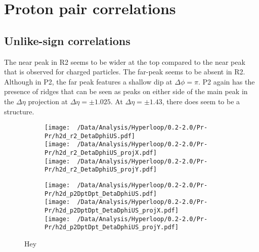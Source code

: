 \documentclass[12pt,a4paper,twoside]{report}
\begin{document}
\section{Proton pair correlations}
\subsection{Unlike-sign correlations}
The near peak in R2 seems to be wider at the top compared to the near peak that is observed for charged particles. The far-peak seems to be absent in R2. Although in P2, the far peak features a shallow dip at $\Delta\phi=\pi$.
P2 again has the presence of ridges that can be seen as peaks on either side of the main peak in the $\Delta\eta$ projection at $\Delta\eta=\pm1.025$. At $\Delta\eta=\pm1.43$, there does seem to be a structure.
\begin{figure}[H]
	\begin{subfigure}{0.49\linewidth}
		\texttt{[image: ~/Data/Analysis/Hyperloop/0.2-2.0/Pr-Pr/h2d\_r2\_DetaDphiUS.pdf]}\\
		\texttt{[image: ~/Data/Analysis/Hyperloop/0.2-2.0/Pr-Pr/h2d\_r2\_DetaDphiUS\_projX.pdf]}\\
		\texttt{[image: ~/Data/Analysis/Hyperloop/0.2-2.0/Pr-Pr/h2d\_r2\_DetaDphiUS\_projY.pdf]}\\
	\end{subfigure}
	\begin{subfigure}{0.49\linewidth}
		\texttt{[image: ~/Data/Analysis/Hyperloop/0.2-2.0/Pr-Pr/h2d\_p2DptDpt\_DetaDphiUS.pdf]}\\
		\texttt{[image: ~/Data/Analysis/Hyperloop/0.2-2.0/Pr-Pr/h2d\_p2DptDpt\_DetaDphiUS\_projX.pdf]}\\
		\texttt{[image: ~/Data/Analysis/Hyperloop/0.2-2.0/Pr-Pr/h2d\_p2DptDpt\_DetaDphiUS\_projY.pdf]}\\
	\end{subfigure}
	\caption{Hey}
\end{figure}
\end{document}
